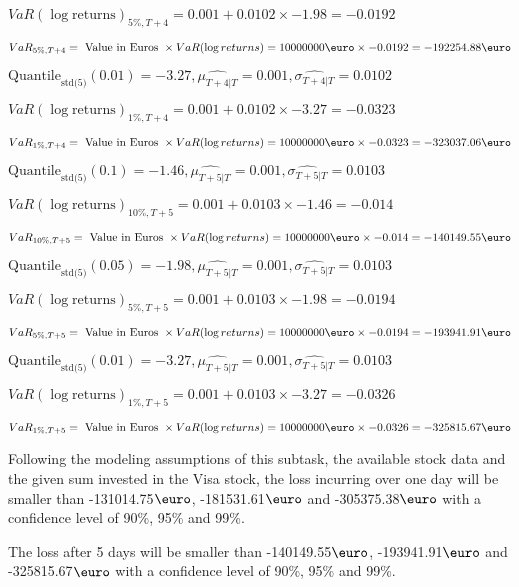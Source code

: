 $VaR(\log \text{returns})_{5\%, T + 4} = 0.001 + 0.0102\times-1.98 = -0.0192$

$VaR_{5\%, T + 4} = \text{ Value in Euros } \times VaR(\log returns) = 10 000 000 \text{\euro} \times-0.0192 = -192254.88 \text{\euro}$


$\text{Quantile}_\text{std(5)}(0.01) = -3.27,\hat{\mu_{T+4|T}} = 0.001, \hat{\sigma_{T+4|T}} = 0.0102$

$VaR(\log \text{returns})_{1\%, T + 4} = 0.001 + 0.0102\times-3.27 = -0.0323$

$VaR_{1\%, T + 4} = \text{ Value in Euros } \times VaR(\log returns) = 10 000 000 \text{\euro} \times-0.0323 = -323037.06 \text{\euro}$


$\text{Quantile}_\text{std(5)}(0.1) = -1.46,\hat{\mu_{T+5|T}} = 0.001, \hat{\sigma_{T+5|T}} = 0.0103$

$VaR(\log \text{returns})_{10\%, T + 5} = 0.001 + 0.0103\times-1.46 = -0.014$

$VaR_{10\%, T + 5} = \text{ Value in Euros } \times VaR(\log returns) = 10 000 000 \text{\euro} \times-0.014 = -140149.55 \text{\euro}$


$\text{Quantile}_\text{std(5)}(0.05) = -1.98,\hat{\mu_{T+5|T}} = 0.001, \hat{\sigma_{T+5|T}} = 0.0103$

$VaR(\log \text{returns})_{5\%, T + 5} = 0.001 + 0.0103\times-1.98 = -0.0194$

$VaR_{5\%, T + 5} = \text{ Value in Euros } \times VaR(\log returns) = 10 000 000 \text{\euro} \times-0.0194 = -193941.91 \text{\euro}$


$\text{Quantile}_\text{std(5)}(0.01) = -3.27,\hat{\mu_{T+5|T}} = 0.001, \hat{\sigma_{T+5|T}} = 0.0103$

$VaR(\log \text{returns})_{1\%, T + 5} = 0.001 + 0.0103\times-3.27 = -0.0326$

$VaR_{1\%, T + 5} = \text{ Value in Euros } \times VaR(\log returns) = 10 000 000 \text{\euro} \times-0.0326 = -325815.67 \text{\euro}$


Following the modeling assumptions of this subtask, the available stock data and the given sum invested in the Visa stock, the loss incurring over one day will be smaller than -131014.75$\text{\euro}$, -181531.61$\text{\euro}$  and -305375.38$\text{\euro}$  with a confidence level of 90\%, 95\%  and 99\%.

The loss after 5 days will be smaller than -140149.55$\text{\euro}$, -193941.91$\text{\euro}$  and -325815.67$\text{\euro}$  with a confidence level of 90\%, 95\%  and 99\%.


